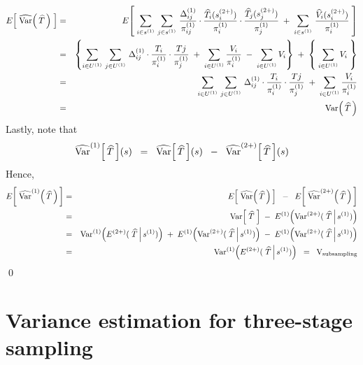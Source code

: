 \begin{eqnarray*}
E\!\left[\;\widehat{\textnormal{Var}}\!\left(\,\widehat{T}\,\right)\;\right]
&=&
E\!\left[\;
\sum_{i\in s^{(1)}}\,\sum_{j\in s^{(1)}}\,
\dfrac{\Delta^{(1)}_{ij}}{\pi^{(1)}_{ij}}
\cdot
\dfrac{\widehat{T}_{i}(s^{(2+)}_{i})}{\pi^{(1)}_{i}}
\cdot
\dfrac{\widehat{T}_{j}(s^{(2+)}_{j})}{\pi^{(1)}_{j}}
\;+\;
\sum_{i\in s^{(1)}}\,\dfrac{\widehat{V}_{i}(s^{(2+)}_{i})}{\pi^{(1)}_{i}}
\;\right]
\\
&=&
\left\{
\sum_{i \in U^{(1)}}\,\sum_{j \in U^{(1)}}\,
\Delta^{(1)}_{ij} \cdot \dfrac{T_{i}}{\pi^{(1)}_{i}} \cdot \dfrac{T{j}}{\pi^{(1)}_{j}}
\;+\;
\sum_{i \in U^{(1)}} \dfrac{V_{i}}{\pi^{(1)}_{i}}
\;-\;
\sum_{i \in U^{(1)}} V_{i}
\right\}
\;+\;
\left\{\;\sum_{i \in U^{(1)}} V_{i}\;\right\}
\\
&=&
\sum_{i \in U^{(1)}}\,\sum_{j \in U^{(1)}}\,
\Delta^{(1)}_{ij} \cdot \dfrac{T_{i}}{\pi^{(1)}_{i}} \cdot \dfrac{T{j}}{\pi^{(1)}_{j}}
\;+\;
\sum_{i \in U^{(1)}} \dfrac{V_{i}}{\pi^{(1)}_{i}}
\\
&=&
\textnormal{Var}\!\left(\,\widehat{T}\,\right)
\end{eqnarray*}
Lastly, note that
\begin{equation*}
\widehat{\textnormal{Var}}^{(1)}\!\left[\,\widehat{T}\,\right]\!(s)
\;\;=\;\;
\widehat{\textnormal{Var}}\!\left[\,\widehat{T}\,\right]\!(s)
\;\;-\;\;
\widehat{\textnormal{Var}}^{(2+)}\!\left[\,\widehat{T}\,\right]\!(s)
\end{equation*}
Hence,
\begin{eqnarray*}
E\!\left[\;
\widehat{\Var}^{(1)}\!\left(\,\widehat{T}\,\right)
\,\right]
&=&
E\!\left[\;\widehat{\Var}\!\left(\,\widehat{T}\,\right)\,\right]
\;\;-\;\;
E\!\left[\;\widehat{\Var}^{(2+)}\!\left(\,\widehat{T}\,\right)\,\right]
\\
&=&
\Var\!\left[\;\widehat{T}\;\right] \;-\; E^{(1)}\!\left(\Var^{(2+)}(\,\left.\widehat{T}\,\right\vert s^{(1)})\right)
\\
&=&
\Var^{(1)}\!\left(E^{(2+)}(\,\left.\widehat{T}\,\right\vert s^{(1)})\right)
\;+\;
E^{(1)}\!\left(\Var^{(2+)}(\,\left.\widehat{T}\,\right\vert s^{(1)})\right)
\;-\;
E^{(1)}\!\left(\Var^{(2+)}(\,\left.\widehat{T}\,\right\vert s^{(1)})\right)
\\
&=&
\Var^{(1)}\!\left(E^{(2+)}(\,\left.\widehat{T}\,\right\vert s^{(1)})\right)
\;\;=\;\;\textnormal{V}_{\textnormal{subsampling}}
\end{eqnarray*}
\qed


\section{Variance estimation for three-stage sampling}
\setcounter{theorem}{0}
\setcounter{equation}{0}

